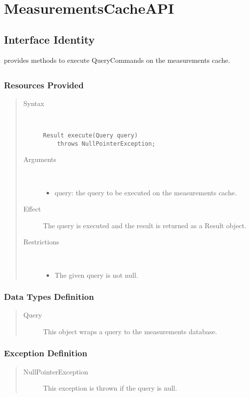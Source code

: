 \section{MeasurementsCacheAPI}

\subsection{Interface Identity}

\npar {} provides methods to execute
QueryCommands on the measurements cache.

\subsection{}

\subsubsection{Resources Provided}

\begin{quote}
	\begin{description}
		\item[Syntax] \ 
		\begin{verbatim}
Result execute(Query query) 
    throws NullPointerException;
		\end{verbatim}
		\item[Arguments] \
		\begin{itemize}
			\item query: the query to be executed on the measurements cache. 
		\end{itemize}
		\item[Effect] The query is executed and the result is returned as a Result
		object.
		\item[Restrictions] \ 
		\begin{itemize}
			\item The given query is not null.
		\end{itemize}
	\end{description} 
\end{quote}

\subsubsection{Data Types Definition}

\begin{quote}
	\begin{description}
		\item[Query] This object wraps a query to the measurements database.
	\end{description} 
\end{quote}

\subsubsection{Exception Definition}

\begin{quote}
	\begin{description}
		\item[NullPointerException] This exception is thrown if the query is null.
	\end{description} 
\end{quote}
